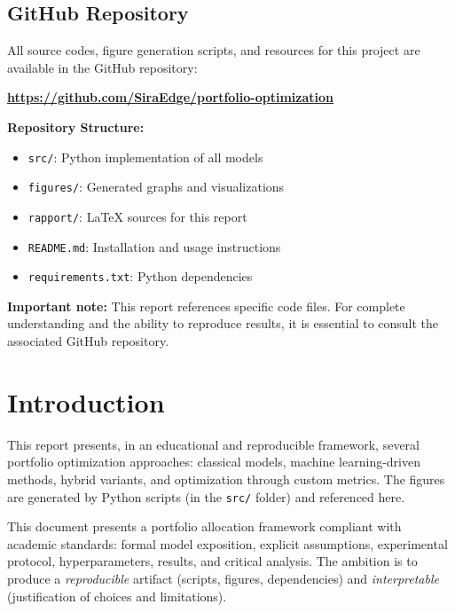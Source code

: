 \documentclass[11pt,a4paper]{article}
\begin{document}
\subsection*{GitHub Repository}
All source codes, figure generation scripts, and resources for this project are available in the GitHub repository:
\begin{center}
\textbf{\url{https://github.com/SiraEdge/portfolio-optimization}}
\end{center}

\textbf{Repository Structure:}
\begin{itemize}
    \item \texttt{src/}: Python implementation of all models
    \item \texttt{figures/}: Generated graphs and visualizations
    \item \texttt{rapport/}: LaTeX sources for this report
    \item \texttt{README.md}: Installation and usage instructions
    \item \texttt{requirements.txt}: Python dependencies
\end{itemize}

\textbf{Important note:} This report references specific code files. For complete understanding and the ability to reproduce results, it is essential to consult the associated GitHub repository.

\newpage

\tableofcontents

\newpage

\section{Introduction}
This report presents, in an educational and reproducible framework, several portfolio optimization approaches: classical models, machine learning-driven methods, hybrid variants, and optimization through custom metrics. The figures are generated by Python scripts (in the \texttt{src/} folder) and referenced here.

\begin{tcolorbox}[title=Research context and objectives]
This document presents a portfolio allocation framework compliant with academic standards: formal model exposition, explicit assumptions, experimental protocol, hyperparameters, results, and critical analysis. The ambition is to produce a \emph{reproducible} artifact (scripts, figures, dependencies) and \emph{interpretable} (justification of choices and limitations).
\end{tcolorbox}
\end{document}

